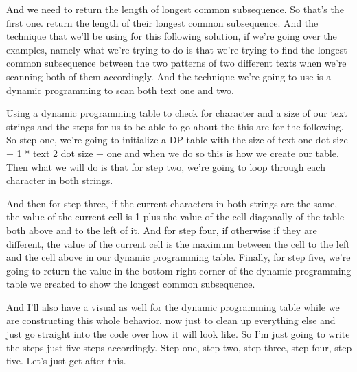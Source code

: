 \expandafter\def\csname sourceexcerpt@46\endcsname{%
And we need to return the length of longest common subsequence. So that's the first
one. return the length of their longest common subsequence. And the technique that
we'll be using for this following solution, if we're going over the examples, namely
what we're trying to do is that we're trying to find the longest common subsequence
between the two patterns of two different texts when we're scanning both of them
accordingly. And the technique we're going to use is a dynamic programming to scan
both text one and two.

Using a dynamic programming table to check for character and a size of our text
strings and the steps for us to be able to go about the this are for the following. So
step one, we're going to initialize a DP table with the size of text one dot size + 1
* text 2 dot size + one and when we do so this is how we create our table. Then what
we will do is that for step two, we're going to loop through each character in both
strings.

And then for step three, if the current characters in both strings are the same, the
value of the current cell is 1 plus the value of the cell diagonally of the table both
above and to the left of it. And for step four, if otherwise if they are different,
the value of the current cell is the maximum between the cell to the left and the cell
above in our dynamic programming table. Finally, for step five, we're going to return
the value in the bottom right corner of the dynamic programming table we created to
show the longest common subsequence.

And I'll also have a visual as well for the dynamic programming table while we are
constructing this whole behavior. now just to clean up everything else and just go
straight into the code over how it will look like. So I'm just going to write the
steps just five steps accordingly. Step one, step two, step three, step four, step
five. Let's just get after this.
}

